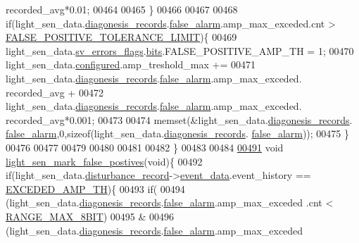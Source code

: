 \begin{DoxyCode}
      recorded\_avg*0.01;
00464 
00465       \}
00466 
00467 
00468       \textcolor{keywordflow}{if}(light\_sen\_data.\hyperlink{a00024_a7ae905b560513ad201e58c2f63375030}{diagonesis\_records}.\hyperlink{a00017_a799f50625c0c03f9404a59287810113d}{false\_alarm}.amp\_max\_exceded.cnt > 
      \hyperlink{a00024_aa88a423475bb5b13601785eed80fb1b9}{FALSE\_POSITIVE\_TOLERANCE\_LIMIT})\{
00469           light\_sen\_data.\hyperlink{a00024_aaeec6b0609dba31393f337abf1cce3d3}{sv\_errors\_flags}.\hyperlink{a00022_ab81eb6fb4f1351ed07b4d6c4dd6f1959}{bits}.FALSE\_POSITIVE\_AMP\_TH = 1;
00470           light\_sen\_data.\hyperlink{a00024_a94b2d1f6ea4ab334c74d24984dd27843}{configured}.amp\_treshold\_max +=
00471           light\_sen\_data.\hyperlink{a00024_a7ae905b560513ad201e58c2f63375030}{diagonesis\_records}.\hyperlink{a00017_a799f50625c0c03f9404a59287810113d}{false\_alarm}.amp\_max\_exceded.
      recorded\_avg +
00472           light\_sen\_data.\hyperlink{a00024_a7ae905b560513ad201e58c2f63375030}{diagonesis\_records}.\hyperlink{a00017_a799f50625c0c03f9404a59287810113d}{false\_alarm}.amp\_max\_exceded.
      recorded\_avg*0.001;
00473 
00474            memset(&light\_sen\_data.\hyperlink{a00024_a7ae905b560513ad201e58c2f63375030}{diagonesis\_records}.
      \hyperlink{a00017_a799f50625c0c03f9404a59287810113d}{false\_alarm},0,\textcolor{keyword}{sizeof}(light\_sen\_data.\hyperlink{a00024_a7ae905b560513ad201e58c2f63375030}{diagonesis\_records}.
      \hyperlink{a00017_a799f50625c0c03f9404a59287810113d}{false\_alarm}));
00475       \}
00476 
00477 
00479 
00480 
00481 
00482 \}
00483 
00484 
\hypertarget{a00047_source_l00491}{}\hyperlink{a00047_acef1622ec5c40fe90bf6184813716e34}{00491} \textcolor{keywordtype}{void} \hyperlink{a00047_acef1622ec5c40fe90bf6184813716e34}{light\_sen\_mark\_false\_postives}(\textcolor{keywordtype}{void})\{
00492         \textcolor{keywordflow}{if}(light\_sen\_data.\hyperlink{a00024_ac9b38e2c1d3f1013a88d33506c754152}{disturbance\_record}->\hyperlink{a00028_a8c0bda69e71ef674e60da47ad0be9ab0}{event\_data}.event\_history == 
      \hyperlink{a00019_a9c5372190518a7d696da393f1a9a5fb9}{EXCEDED\_AMP\_TH})\{
00493                \textcolor{keywordflow}{if}(
00494                 (light\_sen\_data.\hyperlink{a00024_a7ae905b560513ad201e58c2f63375030}{diagonesis\_records}.\hyperlink{a00017_a799f50625c0c03f9404a59287810113d}{false\_alarm}.amp\_max\_exceded
      .cnt < \hyperlink{a00021_ae0c75a1cb44e5d3f00ec7c9e40acfda8}{RANGE\_MAX\_8BIT})
00495                 &
00496                 (light\_sen\_data.\hyperlink{a00024_a7ae905b560513ad201e58c2f63375030}{diagonesis\_records}.\hyperlink{a00017_a799f50625c0c03f9404a59287810113d}{false\_alarm}.amp\_max\_exceded

\end{DoxyCode}
